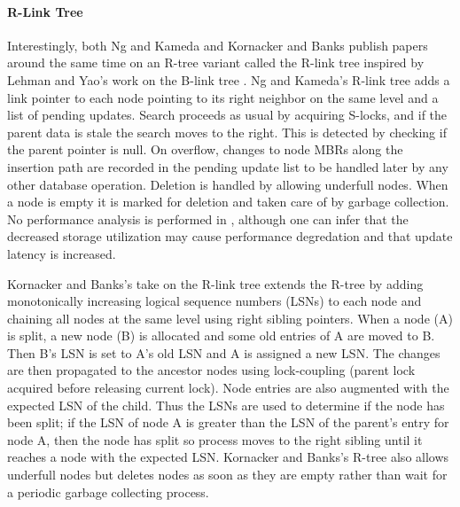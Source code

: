 \paragraph{R-Link Tree} Interestingly, both Ng and Kameda\cite{ng1994r} and 
Kornacker and Banks\cite{kornacker1995high} publish papers around the same time on 
an R-tree variant called the R-link tree inspired by Lehman and Yao's work on the 
B-link tree \cite{lehman1981efficient}. Ng and Kameda's R-link tree\cite{ng1994r} 
adds a link pointer to each node pointing to its right neighbor on the same level and
a list of pending updates. Search proceeds as usual by acquiring S-locks, and 
if the parent data is stale the search moves to the right. This is detected by
checking if the parent pointer is null. On overflow, changes to node MBRs along 
the insertion path are recorded in the pending update list to be handled later 
by any other database operation. Deletion is handled by allowing underfull nodes.
When a node is empty it is marked for deletion and taken care of by garbage
collection. No performance analysis is performed in \cite{ng1994r}, although one
can infer that the decreased storage utilization may cause performance degredation
and that update latency is increased.

Kornacker and Banks's take on the R-link tree\cite{kornacker1995high} extends 
the R-tree by adding monotonically increasing logical sequence numbers (LSNs) 
to each node and chaining all nodes at the same level using right sibling 
pointers. When a node (A) is split, a new node (B) is allocated and some old 
entries of A are moved to B. Then B's LSN is set to A's old LSN and A is assigned 
a new LSN. The changes are then propagated to the ancestor nodes using lock-coupling
(parent lock acquired before releasing current lock). Node entries are also 
augmented with the expected LSN of the child. Thus the LSNs are used 
to determine if the node has been split; if the LSN of node A is greater than 
the LSN of the parent's entry for node A, then the node has split so process 
moves to the right sibling until it reaches a node with the expected LSN. 
Kornacker and Banks's R-tree also allows underfull nodes but deletes nodes as 
soon as they are empty rather than wait for a periodic garbage collecting process.

	
